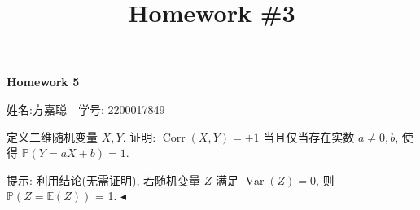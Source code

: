 \documentclass[11pt]{article}
\title{Homework \#3}
\newenvironment{problem}[2][Problem]{\begin{trivlist}
    \item[\hskip \labelsep {\bfseries #1}\hskip \labelsep {\bfseries #2.}]\songti}{\hfill$\blacktriangleleft$\end{trivlist}}
\newcommand\1{\mathds{1}}
\newcommand\E{\mathbb{E}}
\newcommand\PP{\mathbb{P}}
\DeclareMathOperator{\Var}{Var}
\DeclareMathOperator{\Corr}{Corr}
\begin{document}
\kaishu

\pagestyle{fancy}
\chead{}
\fancyfoot[R]{} 
\fancyfoot[C]{\thepage\ /\ \pageref{LastPage} \\ \textcolor{lightgray}{最后编译时间: \today}}


\begin{center}
    {\LARGE \bf Homework 5}

    {姓名:方嘉聪\ \  学号: 2200017849}            %
\end{center}
\begin{problem}{1}
    定义二维随机变量 $X,Y$. 证明: $\Corr(X,Y) = \pm 1$ 当且仅当存在实数 $a\neq 0,b$, 使得 $\PP(Y=aX+b) = 1$.
    
    {\kaishu 提示: 利用结论(无需证明), 若随机变量 $Z$ 满足 $\Var(Z) = 0$, 则 $\PP(Z = \E(Z))$ = 1.}
\end{problem}
\end{document}
